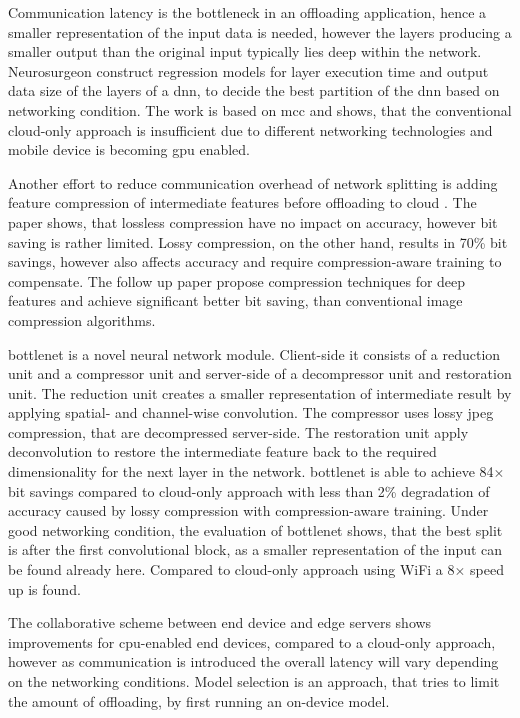 Communication latency is the bottleneck in an offloading application, hence a smaller representation of the input data is needed, however the layers producing a smaller output than the original input typically lies deep within the network. Neurosurgeon construct regression models for layer execution time and  output data size of the layers of a \gls{dnn}, to decide the best partition of the \gls{dnn} based on networking condition. The work is based on \gls{mcc} and shows, that the conventional cloud-only approach is insufficient due to different networking technologies and mobile device is becoming \gls{gpu} enabled. 

Another effort to reduce communication overhead of network splitting is adding feature compression of intermediate features before offloading to cloud \cite{choi_deep_2018}. The paper shows, that lossless compression have no impact on accuracy, however bit saving is rather limited. Lossy compression, on the other hand, results in 70\% bit savings, however also affects accuracy and require compression-aware training to compensate. The follow up paper \cite{choi_near-lossless_2018} propose compression techniques for deep features and achieve significant better bit saving, than conventional image compression algorithms. 

\gls{bottlenet} \cite{eshratifar_bottlenet:_2019} is a novel neural network module. Client-side it consists of a reduction unit and a compressor unit and server-side of a decompressor unit and restoration unit. The reduction unit creates a smaller representation of intermediate result by applying spatial- and channel-wise convolution. The compressor uses lossy \gls{jpeg} compression, that are decompressed server-side. The restoration unit apply deconvolution to restore the intermediate feature back to the required dimensionality for the next layer in the network. \gls{bottlenet} is able to achieve 84$\times$ bit savings compared to cloud-only approach with less than 2\% degradation of accuracy caused by lossy compression with compression-aware training. Under good networking condition, the evaluation of \gls{bottlenet} shows, that the best split is after the first convolutional block, as a smaller representation of the input can be found already here. Compared to cloud-only approach using WiFi a 8$\times$ speed up is found.

The collaborative scheme between end device and edge servers shows improvements for \gls{cpu}-enabled end devices, compared to a cloud-only approach, however as communication is introduced the overall latency will vary depending on the networking conditions. Model selection is an approach, that tries to limit the amount of offloading, by first running an on-device model. 


